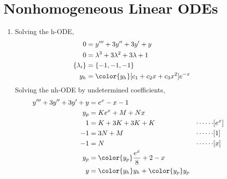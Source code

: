 \section{Nonhomogeneous Linear ODEs}

\begin{enumerate}
    \item Solving the h-ODE,
          \begin{align}
              0               & = y''' + 3y'' + 3y' + y                           \\
              0               & = \lambda^{3} + 3\lambda^{2} + 3\lambda + 1       \\
              \{\lambda_{i}\} & = \{-1, -1, -1\}                                  \\
              y_{h}           & = \color{y_h} [c_{1} + c_{2}x + c_{3}x^{2}]e^{-x}
          \end{align}
          Solving the nh-ODE by undetermined coefficients,
          \begin{align}
              y''' + 3y'' + 3y' + y & = e^{x} - x - 1                                                      \\
              y_{p}                 & = Ke^{x} + M + Nx                                                    \\
              1                     & = K + 3K + 3K + K                           & \cdots\cdots & [e^{x}] \\
              -1                    & = 3N + M                                    & \cdots\cdots & [1]     \\
              -1                    & = N                                         & \cdots\cdots & [x]     \\
              y_{p}                 & = \color{y_p} \frac{e^{x}}{8} + 2 - x                                \\
              y                     & = {\color{y_h} y_{h}} + {\color{y_p} y_{p}}
          \end{align}


\end{enumerate}

